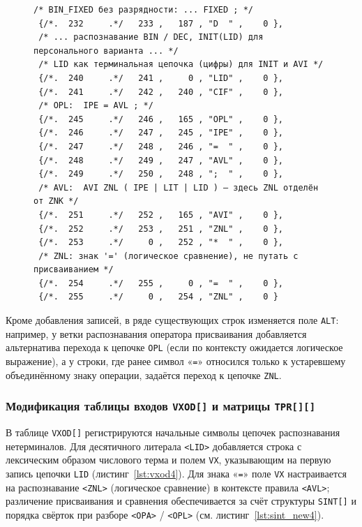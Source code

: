 \documentclass[a4paper,14pt]{extarticle}
\begin{document}
\begin{figure}[H]
\begin{lstlisting}[style=Cstyle,caption={Фрагмент новых записей \texttt{SINT[]} (ветви \texttt{LID}, \texttt{ZNL}, \texttt{AVL}, \texttt{OPL})},label=lst:sint_new4]
 /* BIN_FIXED без разрядности: ... FIXED ; */
 {/*.  232     .*/   233 ,   187 , "D  " ,    0 },
 /* ... распознавание BIN / DEC, INIT(LID) для персонального варианта ... */
 /* LID как терминальная цепочка (цифры) для INIT и AVI */
 {/*.  240     .*/   241 ,     0 , "LID" ,    0 },
 {/*.  241     .*/   242 ,   240 , "CIF" ,    0 },
 /* OPL:  IPE = AVL ; */
 {/*.  245     .*/   246 ,   165 , "OPL" ,    0 },
 {/*.  246     .*/   247 ,   245 , "IPE" ,    0 },
 {/*.  247     .*/   248 ,   246 , "=  " ,    0 },
 {/*.  248     .*/   249 ,   247 , "AVL" ,    0 },
 {/*.  249     .*/   250 ,   248 , ";  " ,    0 },
 /* AVL:  AVI ZNL ( IPE | LIT | LID ) — здесь ZNL отделён от ZNK */
 {/*.  251     .*/   252 ,   165 , "AVI" ,    0 },
 {/*.  252     .*/   253 ,   251 , "ZNL" ,    0 },
 {/*.  253     .*/     0 ,   252 , "*  " ,    0 },
 /* ZNL: знак '=' (логическое сравнение), не путать с присваиванием */
 {/*.  254     .*/   255 ,     0 , "=  " ,    0 },
 {/*.  255     .*/     0 ,   254 , "ZNL" ,    0 }
\end{lstlisting}
\end{figure}

Кроме добавления записей, в ряде существующих строк изменяется поле \texttt{ALT}: например, у ветки распознавания
оператора присваивания добавляется альтернатива перехода к цепочке \texttt{OPL} (если по контексту ожидается логическое выражение),
а у строки, где ранее символ «\texttt{=}» относился только к устаревшему объединённому знаку операции, задаётся переход к цепочке \texttt{ZNL}.

\subsubsection*{Модификация таблицы входов \texttt{VXOD[]} и матрицы \texttt{TPR[][]}}

В таблице \texttt{VXOD[]} регистрируются начальные символы цепочек распознавания нетерминалов. Для десятичного литерала \texttt{<LID>}
добавляется строка с лексическим образом числового терма и полем \texttt{VX}, указывающим на первую запись цепочки \texttt{LID}
(листинг~\ref{lst:vxod4}). Для знака «\texttt{=}» поле \texttt{VX} настраивается на распознавание \texttt{<ZNL>} (логическое сравнение)
в контексте правила \texttt{<AVL>}; различение присваивания и сравнения обеспечивается за счёт структуры \texttt{SINT[]} и порядка
свёрток при разборе \texttt{<OPA>} / \texttt{<OPL>} (см. листинг~\ref{lst:sint_new4}).
\end{document}
